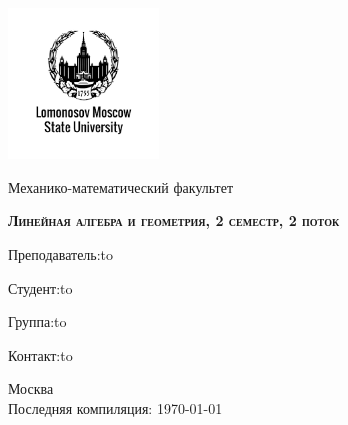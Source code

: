 \documentclass[a4paper, 12pt]{article}
\theoremstyle{definition}
\theoremstyle{plain}
\theoremstyle{remark}
\begin{document}
  \begin{titlepage}
    \newpage
    \begin{center}
    \includegraphics[width=4cm]{image/image.png}
    \end{center}
    \vspace{4em}
    
    \begin{center}
    \Large Механико-математический факультет  
    \end{center}
    \vspace{2em}
    
    \begin{center}
    \large{\textsc{\textbf{Линейная алгебра и геометрия, 2 семестр, 2 поток}}}
    \end{center}
    \vspace{6em}
    
    \newbox{\lbox}
    \newlength{\maxl}
    \setlength{\maxl}{\wd\lbox}
    \hfill\parbox{11cm}
    {
    Преподаватель:\hfill\hbox to\vspace{0.5cm}
    
    Студент:\hfill\hbox to\vspace{0.5cm}

    Группа:\hfill\hbox to\vspace{0.5cm}
    
    Контакт:\hfill\hbox to\vspace{0.5cm}
    }

    \vspace{\fill}
    \begin{center}
    Москва \\Последняя компиляция: \today
    \end{center}
    
  \end{titlepage}
  \tableofcontents
  \fontsize{14pt}{20pt}\selectfont
  \newpage
  \fontsize{14pt}{20pt}\selectfont
\end{document}
